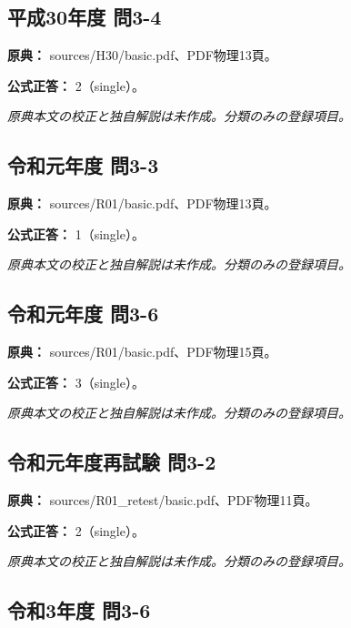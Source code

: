 \subsection{平成30年度 問3-4}
\label{q:h30-reg-basic-3-4}

\noindent\textbf{原典：} sources/H30/basic.pdf、PDF物理13頁。

\textbf{公式正答：} 2（single）。

\par\textit{原典本文の校正と独自解説は未作成。分類のみの登録項目。}

\subsection{令和元年度 問3-3}
\label{q:r01-reg-basic-3-3}

\noindent\textbf{原典：} sources/R01/basic.pdf、PDF物理13頁。

\textbf{公式正答：} 1（single）。

\par\textit{原典本文の校正と独自解説は未作成。分類のみの登録項目。}

\subsection{令和元年度 問3-6}
\label{q:r01-reg-basic-3-6}

\noindent\textbf{原典：} sources/R01/basic.pdf、PDF物理15頁。

\textbf{公式正答：} 3（single）。

\par\textit{原典本文の校正と独自解説は未作成。分類のみの登録項目。}

\subsection{令和元年度再試験 問3-2}
\label{q:r01-ret-basic-3-2}

\noindent\textbf{原典：} sources/R01\_retest/basic.pdf、PDF物理11頁。

\textbf{公式正答：} 2（single）。

\par\textit{原典本文の校正と独自解説は未作成。分類のみの登録項目。}

\subsection{令和3年度 問3-6}
\label{q:r03-reg-basic-3-6}

